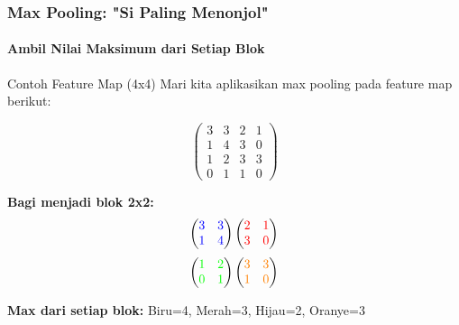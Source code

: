 \documentclass[t,aspectratio=169,xcolor=dvipsnames]{beamer}
\begin{document}
\begin{frame}
    \frametitle{Max Pooling: "Si Paling Menonjol"}
    \framesubtitle{Ambil Nilai Maksimum dari Setiap Blok}
    \scriptsize

    \begin{block}{Contoh Feature Map (4x4)}
        Mari kita aplikasikan max pooling pada feature map berikut:
    \end{block}

    $$
    \begin{pmatrix}
    3 & 3 & 2 & 1 \\
    1 & 4 & 3 & 0 \\
    1 & 2 & 3 & 3 \\
    0 & 1 & 1 & 0
    \end{pmatrix}
    $$

    \textbf{Bagi menjadi blok 2x2:}
    $$
    \begin{pmatrix}
    \color{blue}3 & \color{blue}3 \\
    \color{blue}1 & \color{blue}4
    \end{pmatrix}
    \begin{pmatrix}
    \color{red}2 & \color{red}1 \\
    \color{red}3 & \color{red}0
    \end{pmatrix}
    $$
    $$
    \begin{pmatrix}
    \color{green}1 & \color{green}2 \\
    \color{green}0 & \color{green}1
    \end{pmatrix}
    \begin{pmatrix}
    \color{orange}3 & \color{orange}3 \\
    \color{orange}1 & \color{orange}0
    \end{pmatrix}
    $$

    \textbf{Max dari setiap blok:} Biru=4, Merah=3, Hijau=2, Oranye=3

\end{frame}
\end{document}
